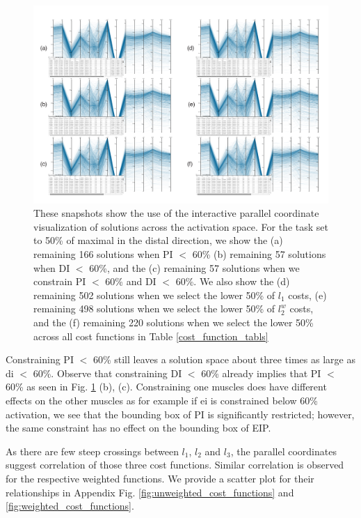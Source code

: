\begin{figure}[htbp]
\centering
\includegraphics[width=\textwidth]{figs/parcoords.pdf}
\caption{These snapshots show the use of the interactive parallel coordinate visualization of solutions across the activation space. For the task set to 50\% of maximal in the distal direction, we show the
(a) remaining 166 solutions when PI $<$ 60\% 
(b) remaining 57 solutions when DI $<$ 60\%, and the
(c) remaining 57 solutions when we constrain PI $<$ 60\% and DI $<$ 60\%. We also show the
(d) remaining 502 solutions when we select the lower 50\% of $l_1$ costs,
(e) remaining 498 solutions when we select the lower 50\% of $l_2^w$ costs, and the
(f) remaining 220 solutions when we select the lower 50\% across all cost functions in Table \ref{cost_function_tabls} }
\label{fig:parcoords}
\end{figure}

Constraining PI $<$ 60\% still leaves a solution space about three times as large as di $<$ 60\%. 
Observe that constraining DI $<$ 60\% already implies that PI $<$ 60\% as seen in Fig. \ref{fig:parcoords} (b), (c). 
Constraining one muscles does have different effects on the other muscles as for example if ei is constrained below 60\% activation, we see that the bounding box of PI is significantly restricted; however, the same constraint has no effect on the bounding box of EIP.

As there are few steep crossings between $l_1$, $l_2$ and $l_3$, the parallel coordinates suggest correlation of those three cost functions.
Similar correlation is observed for the respective weighted functions.
We provide a scatter plot for their relationships in Appendix Fig. \ref{fig:unweighted_cost_functions} and \ref{fig:weighted_cost_functions}.

